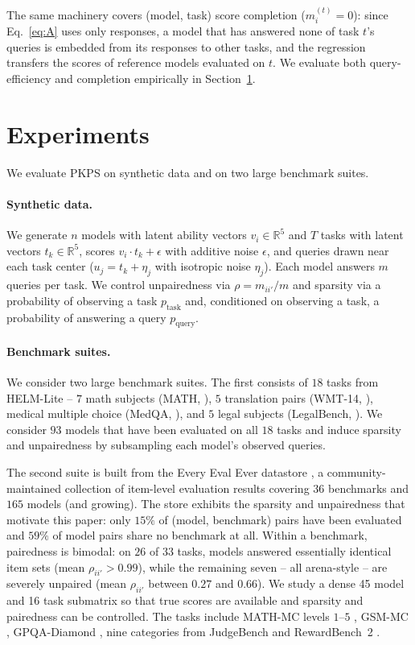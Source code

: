 \documentclass{article}
\theoremstyle{definition}
\theoremstyle{plain}
\newcommand{\PKPS}{PKPS\xspace}
\begin{document}
The same machinery covers (model, task) score completion ($m_i^{(t)}=0$): since
Eq.~\eqref{eq:A} uses only responses, a model that has answered none of task $t$'s
queries is embedded from its responses to other tasks, and the regression transfers
the scores of reference models evaluated on $t$.
We evaluate both query-efficiency and completion empirically in Section~\ref{sec:experiments}.

\section{Experiments}
\label{sec:experiments}
We evaluate \PKPS on synthetic data and on two large benchmark suites.

\paragraph{Synthetic data.} We generate $n$ models with latent ability vectors
$v_i \in \mathbb{R}^{5}$ and $T$ tasks with latent vectors $t_k \in \mathbb{R}^{5}$,
scores $v_i\cdot t_k+\epsilon$ with additive noise $ \epsilon $, and queries drawn near each task center ($u_j = t_k +
\eta_j$ with isotropic noise $\eta_j$).
Each model answers $m$ queries per task. 
We control unpairedness via
$\rho=m_{ii'}/m$ and sparsity via a probability of observing a task
$p_{\mathrm{task}}$ and, conditioned on observing a task, a probability of answering
a query $p_{\mathrm{query}}$.

\paragraph{Benchmark suites.}
We consider two large benchmark suites.
The first consists of $18$ tasks from HELM-Lite \citep{helm} 
-- $7$ math subjects (MATH, \citealp{hendrycks2021math}), $5$ translation pairs
(WMT-14, \citealp{bojar2014wmt}), medical multiple choice
(MedQA, \citealp{jin2021medqa}), and $5$ legal subjects
(LegalBench, \citealp{guha2023legalbench}).
We consider $93$ models that have been evaluated on all $ 18 $ tasks and induce sparsity and unpairedness by subsampling each model's observed queries.

The second suite is built from the Every Eval Ever datastore \citep{eee2026}, a
community-maintained collection of item-level evaluation results covering $36$ benchmarks and $165$ models (and growing).
The store exhibits the sparsity and unpairedness that motivate this paper:
only $15\%$ of (model, benchmark) pairs have been evaluated and $59\%$ of model
pairs share no benchmark at all.
Within a benchmark, pairedness is bimodal: on $26$ of $33$ tasks,
models answered essentially identical item sets (mean $\rho_{ii'}>0.99$), while the
remaining seven -- all arena-style \citep{chiang2024chatbot} -- are severely
unpaired (mean $\rho_{ii'}$ between $0.27$ and $0.66$).
We study a dense 45 model and 16 task submatrix so that true scores are available and
sparsity and pairedness can be controlled.
The tasks include MATH-MC
levels $1$--$5$ \citep{hendrycks2021math}, GSM-MC \citep{cobbe2021gsm8k},
GPQA-Diamond \citep{rein2023gpqa}, nine categories from JudgeBench
\citep{tan2024judgebench} and RewardBench~2 \citep{malik2025rewardbench2}. 
\end{document}
